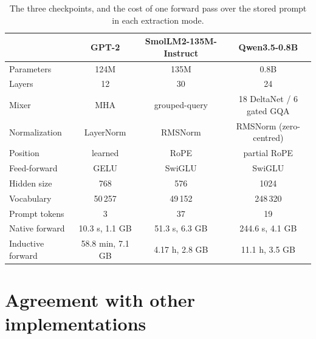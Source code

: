 \documentclass[11pt]{article}
\theoremstyle{plain}
\theoremstyle{definition}
\begin{document}
\begin{table}[t]
\centering
\footnotesize
\begin{tabular}{lccc}
\toprule
& \textbf{GPT-2} & \textbf{SmolLM2-135M-Instruct} & \textbf{Qwen3.5-0.8B} \\
\midrule
Parameters            & 124M            & 135M                  & 0.8B \\
Layers                & 12              & 30                    & 24 \\
Mixer                 & MHA             & grouped-query         & 18 DeltaNet / 6 gated GQA \\
Normalization         & LayerNorm       & RMSNorm               & RMSNorm (zero-centred) \\
Position              & learned         & RoPE                  & partial RoPE \\
Feed-forward          & GELU            & SwiGLU                & SwiGLU \\
Hidden size           & 768             & 576                   & 1024 \\
Vocabulary            & 50\,257         & 49\,152               & 248\,320 \\
\midrule
Prompt tokens         & 3               & 37                    & 19 \\
Native forward        & 10.3 s, 1.1 GB  & 51.3 s, 6.3 GB        & 244.6 s, 4.1 GB \\
Inductive forward     & 58.8 min, 7.1 GB & 4.17 h, 2.8 GB       & 11.1 h, 3.5 GB \\
\bottomrule
\end{tabular}
\caption{The three checkpoints, and the cost of one forward pass over the
stored prompt in each extraction mode.}
\label{tab:models}
\end{table}

\section{Agreement with other implementations}
\label{sec:agree}
\end{document}
